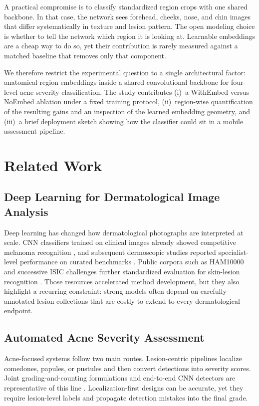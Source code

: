 \documentclass[10pt,conference]{IEEEtran}
\begin{document}
A practical compromise is to classify standardized region crops with one shared backbone. In that case, the network sees forehead, cheeks, nose, and chin images that differ systematically in texture and lesion pattern. The open modeling choice is whether to tell the network which region it is looking at. Learnable embeddings are a cheap way to do so, yet their contribution is rarely measured against a matched baseline that removes only that component.

We therefore restrict the experimental question to a single architectural factor: anatomical region embeddings inside a shared convolutional backbone for four-level acne severity classification. The study contributes (i)~a WithEmbed versus NoEmbed ablation under a fixed training protocol, (ii)~region-wise quantification of the resulting gains and an inspection of the learned embedding geometry, and (iii)~a brief deployment sketch showing how the classifier could sit in a mobile assessment pipeline.

\section{Related Work}
\subsection{Deep Learning for Dermatological Image Analysis}
Deep learning has changed how dermatological photographs are interpreted at scale. CNN classifiers trained on clinical images already showed competitive melanoma recognition \cite{nasr2016melanoma}, and subsequent dermoscopic studies reported specialist-level performance on curated benchmarks \cite{brinker2019cnn,esteva2017dermatologist}. Public corpora such as HAM10000 and successive ISIC challenges further standardized evaluation for skin-lesion recognition \cite{tschandl2018ham10000,codella2018isic}. Those resources accelerated method development, but they also highlight a recurring constraint: strong models often depend on carefully annotated lesion collections that are costly to extend to every dermatological endpoint.

\subsection{Automated Acne Severity Assessment}
Acne-focused systems follow two main routes. Lesion-centric pipelines localize comedones, papules, or pustules and then convert detections into severity scores. Joint grading-and-counting formulations and end-to-end CNN detectors are representative of this line \cite{wu2019joint,junayed2020acnenet}. Localization-first designs can be accurate, yet they require lesion-level labels and propagate detection mistakes into the final grade.
\end{document}
